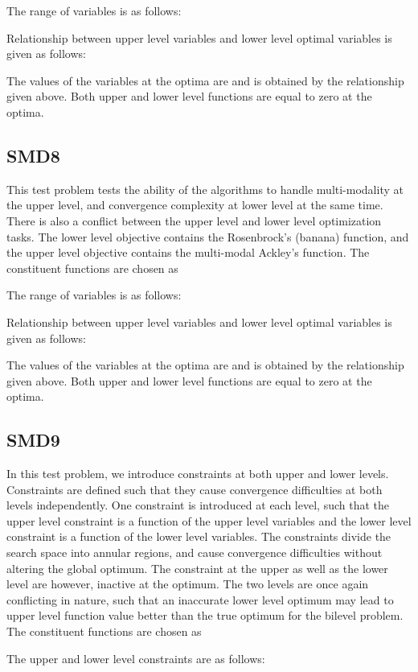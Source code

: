 \documentclass[twoside]{article}
\begin{document}
The range of variables is as follows:

Relationship between upper level variables and lower level optimal variables is given as follows:

The values of the variables at the optima are  and  is obtained by the relationship given above. Both upper and
lower level functions are equal to zero at the optima.

\subsection{SMD8}
This test problem tests the ability of the algorithms to handle multi-modality at the upper level, and convergence complexity at lower level at the same time. There is also a conflict between the upper level and lower level optimization tasks. The lower level objective contains the Rosenbrock's (banana) function, and the upper level objective contains the multi-modal Ackley's function. The constituent functions are chosen as

The range of variables is as follows:

Relationship between upper level variables and lower level optimal variables is given as follows:

The values of the variables at the optima are  and  is obtained by the relationship given above. Both upper and lower level functions are equal to zero at the optima.

\subsection{SMD9}
In this test problem, we introduce constraints at both upper and lower levels. Constraints are defined such that they cause convergence difficulties at both levels independently. One constraint is introduced at each level, such that the upper level constraint is a function of the upper level variables and the lower level constraint is a function of the lower level variables. The constraints divide the search space into annular regions, and cause convergence difficulties without altering the global optimum. The constraint at the upper as well as the lower level are however, inactive at the optimum. The two levels are once again conflicting in nature, such that an inaccurate lower level optimum may lead to upper level function value better than the true optimum for the bilevel problem. The constituent functions are chosen as

The upper and lower level constraints are as follows:
\end{document}
